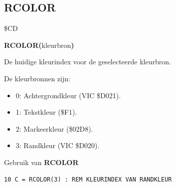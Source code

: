 \subsection{RCOLOR}
\begin{description}[leftmargin=2cm,style=nextline]
\item [Token:]    \$CD

\item [Formaat:]   {\bf RCOLOR(}kleurbron{\bf)}

\item [Retourneert:]  De huidige kleurindex voor de geselecteerde kleurbron.

                  De kleurbronnen zijn:
                  \begin{itemize}
                     \item 0: Achtergrondkleur (VIC \$D021).                     \item 1: Tekstkleur (\$F1).                     \item 2: Markeerkleur (\$02D8).                     \item 3: Randkleur (VIC \$D020).
                  \end{itemize}

\item [Voorbeeld:]  Gebruik van {\bf RCOLOR}

\begin{tcolorbox}[colback=black,coltext=white]
\verbatimfont{\codefont}
\begin{verbatim}
10 C = RCOLOR(3) : REM KLEURINDEX VAN RANDKLEUR
\end{verbatim}
\end{tcolorbox}
\end{description}


\newpage
